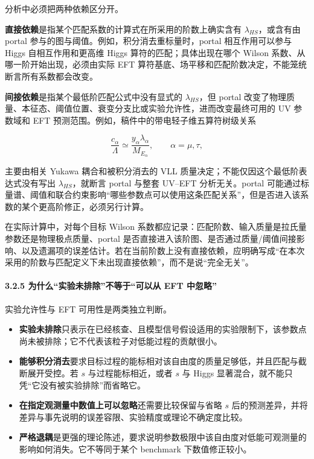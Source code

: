 \documentclass[
  chinese,
  UTF8]{ctexart}
\providecommand{\tightlist}{%
  \setlength{\itemsep}{0pt}\setlength{\parskip}{0pt}}
\begin{document}
分析中必须把两种依赖区分开。

\textbf{直接依赖}是指某个匹配系数的计算式在所采用的阶数上确实含有
\(\lambda_{HS}\)，或含有由 portal
参与的图与阈值。例如，积分消去重标量时，portal 相互作用可以参与 Higgs
自相互作用和更高维 Higgs 算符的匹配；具体出现在哪个 Wilson
系数、从哪一阶开始出现，必须由实际 EFT
算符基底、场平移和匹配阶数决定，不能笼统断言所有系数都会改变。

\textbf{间接依赖}是指某个最低阶匹配公式中没有显式的 \(\lambda_{HS}\)，但
portal
改变了物理质量、本征态、阈值位置、衰变分支比或实验允许性，进而改变最终可用的
UV 参数域和 EFT 预测范围。例如，稿件中的带电轻子维五算符树级关系

\[
\frac{c_\alpha}{\Lambda}\simeq\frac{y_\alpha\lambda_\alpha}{M_{E_\alpha}},\qquad \alpha=\mu,\tau,
\]

主要由相关 Yukawa 耦合和被积分消去的 VLL
质量决定；不能仅因这个最低阶表达式没有写出 \(\lambda_{HS}\)，就断言
portal 与整套 UV--EFT 分析无关。portal
可能通过标量谱、阈值和联合约束影响``哪些参数点可以使用这条匹配关系''，但是否进入该系数的某个更高阶修正，必须另行计算。

在实际计算中，对每个目标 Wilson
系数都应记录：匹配阶数、输入质量是拉氏量参数还是物理极点质量、portal
是否直接进入该阶图、是否通过质量/阈值间接影响、以及遗漏项的误差估计。若在当前阶数上没有直接依赖，应明确写成``在本次采用的阶数与匹配定义下未出现直接依赖''，而不是说``完全无关''。

\paragraph{3.2.5 为什么``实验未排除''不等于``可以从 EFT
中忽略''}\label{ux4e3aux4ec0ux4e48ux5b9eux9a8cux672aux6392ux9664ux4e0dux7b49ux4e8eux53efux4ee5ux4ece-eft-ux4e2dux5ffdux7565}

实验允许性与 EFT 可用性是两类独立判断。

\begin{itemize}
\tightlist
\item
  \textbf{实验未排除}只表示在已经核查、且模型信号假设适用的实验限制下，该参数点尚未被排除；它不代表该粒子对低能过程的贡献很小。
\item
  \textbf{能够积分消去}要求目标过程的能标相对该自由度的质量足够低，并且匹配与截断展开受控。若
  \(s\) 与过程能标相近，或者 \(s\) 与 Higgs
  显著混合，就不能只凭``它没有被实验排除''而省略它。
\item
  \textbf{在指定观测量中数值上可以忽略}还需要比较保留与省略 \(s\)
  后的预测差异，并将差异与事先说明的误差容限、实验精度或理论不确定度比较。
\item
  \textbf{严格退耦}是更强的理论陈述，要求说明参数极限中该自由度对低能可观测量的影响如何消失。它不等同于某个
  benchmark 下数值修正较小。
\end{itemize}
\end{document}
